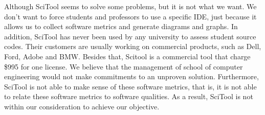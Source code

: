 Although SciTool seems to solve some problems, but it is not what we want. We don't want to force students and professors to use a specific IDE, just because it allows us to collect software metrics and generate diagrams and graphs. In addition, SciTool has never been used by any university to assess student source codes. Their customers are usually working on commercial products, such as Dell, Ford, Adobe and BMW. Besides that, Scitool is a commercial tool that charge \$995 for one license. We believe that the management of school of computer engineering would not make commitments to an unproven solution. Furthermore, SciTool is not able to make sense of these software metrics, that is, it is not able to relate these software metrics to software qualities. As a result, SciTool is not within our consideration to achieve our objective.